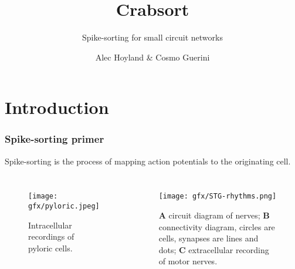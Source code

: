 \documentclass{beamer}
\title{Crabsort}
\subtitle{Spike-sorting for small circuit networks}
\author{Alec Hoyland & Cosmo Guerini}
\institute[CSN]{Center for Systems Neuroscience}
\begin{document}

\begin{frame}
  \titlepage
\end{frame}


\section{Introduction}


\begin{frame}
  \frametitle{Spike-sorting primer}

  Spike-sorting is the process of mapping action potentials to the originating cell.

  \begin{columns}

    \begin{figure}
      \texttt{[image: gfx/pyloric.jpeg]}
      \centering
      \caption{Intracellular recordings of pyloric cells.}
      \label{fig:intracellular}
    \end{figure}


    \begin{figure}
      \texttt{[image: gfx/STG-rhythms.png]}
      \centering
      \caption{\textbf{A} circuit diagram of nerves; \textbf{B} connectivity diagram, circles are cells, synapses are lines and dots; \textbf{C} extracellular recording of motor nerves.}
      \label{fig:extracellular}
    \end{figure}

  \end{columns}

\end{frame}

\end{document}
